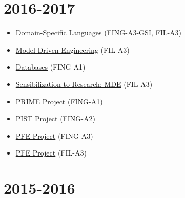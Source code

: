 \hypertarget{section-6}{%
\section{2016-2017}\label{section-6}}

\begin{itemize}
\tightlist
\item
  \href{https://campusneo.mines-nantes.fr/campus/course/view.php?id=1609}{Domain-Specific
  Languages} (FING-A3-GSI, FIL-A3)
\item
  \href{https://campusneo.mines-nantes.fr/campus/course/view.php?id=1628}{Model-Driven
  Engineering} (FIL-A3)
\item
  \href{https://campusneo.mines-nantes.fr/campus/course/view.php?id=1598}{Databases}
  (FING-A1)
\item
  \href{https://campusneo.mines-nantes.fr/campus/course/view.php?id=1532}{Sensibilization
  to Research: MDE} (FIL-A3)
\item
  \href{https://campusneo.mines-nantes.fr/campus/course/view.php?id=621}{PRIME
  Project} (FING-A1)
\item
  \href{https://campusneo.mines-nantes.fr/campus/course/view.php?id=115}{PIST
  Project} (FING-A2)
\item
  \href{https://campusneo.mines-nantes.fr/campus/course/view.php?id=1540}{PFE
  Project} (FING-A3)
\item
  \href{https://campusneo.mines-nantes.fr/campus/course/view.php?id=1344}{PFE
  Project} (FIL-A3)
\end{itemize}

\hypertarget{section-7}{%
\section{2015-2016}\label{section-7}}

